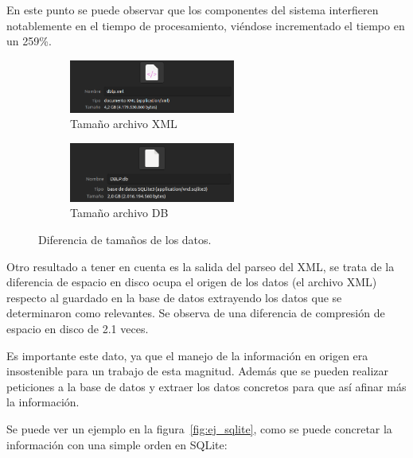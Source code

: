 \documentclass[a4paper, 12pt]{book}
\begin{document}
En este punto se puede observar que los componentes del sistema interfieren notablemente en el tiempo de procesamiento, viéndose incrementado el tiempo en un 259\%.



\begin{figure}[h]
    \centering
    \begin{subfigure}{\textwidth}
        \centering
        \includegraphics[width=0.6\textwidth]{img/tamaño_xml.png} %
        \caption{Tamaño archivo XML}
        \label{fig:xml_tam}
    \end{subfigure}
    \vspace{0.5cm} %
    \begin{subfigure}{\textwidth}
        \centering
        \includegraphics[width=0.6\textwidth]{img/tamaño_db.png} %
        \caption{Tamaño archivo DB}
        \label{fig:db_tam}
    \end{subfigure}
    \caption{Diferencia de tamaños de los datos.}
    \label{fig:tamaños}
\end{figure}


Otro resultado a tener en cuenta es la salida del parseo del XML, se trata de la diferencia de espacio en disco ocupa el origen de los datos (el archivo XML) respecto al guardado en la base de datos extrayendo los datos que se determinaron como relevantes. Se observa de una diferencia de compresión de espacio en disco de 2.1 veces. 


Es importante este dato, ya que el manejo de la información en origen era insostenible para un trabajo de esta magnitud. Además que se pueden realizar peticiones a la base de datos y extraer los datos concretos para que así afinar más la información.

Se puede ver un ejemplo en la figura~\ref{fig:ej_sqlite}, como se puede concretar la información con una simple orden en SQLite:
\end{document}
